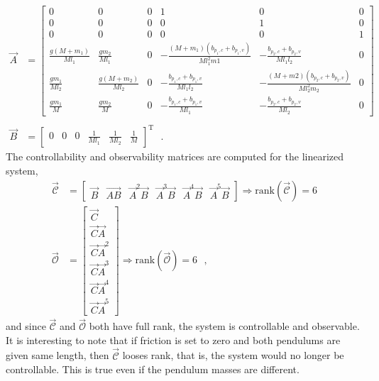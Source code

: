 \begin{align}
  \vec{A} &= 
  \begin{bmatrix}
    0                         & 0                         & 0 & 1                                                    & 0                                                    & 0 \\
    0                         & 0                         & 0 & 0                                                    & 1                                                    & 0 \\
    0                         & 0                         & 0 & 0                                                    & 0                                                    & 1 \\
    \frac{g (M + m_1)}{M l_1} & \frac{g m_2}{M l_1}       & 0 & -\frac{(M + m_1)(b_{p_1,c} + b_{p_1,v})}{M l_1^2 m1} & -\frac{b_{p_2,c} + b_{p_2,v}}{M l_1 l_2}             & 0 \\
    \frac{g m_1}{M l_2}       & \frac{g (M + m_2)}{M l_2} & 0 & -\frac{b_{p_1,c} + b_{p_1,v}}{M l_1 l_2}             & -\frac{(M + m2)(b_{p_2,c} + b_{p_2,v})}{M l_2^2 m_2} & 0 \\
    \frac{g m_1}{M}           & \frac{g m_2}{M}           & 0 & -\frac{b_{p_1,c} + b_{p_1,v}}{M l_1}                 & -\frac{b_{p_2,c} + b_{p_2,v}}{M l_2}                 & 0
  \end{bmatrix}  \label{eq:linearTwin_A} \\
  \nonumber \\
  \vec{B} &= 
  \begin{bmatrix}
    0  &  0  &  0  &  \frac{1}{M l_1} & \frac{1}{M l_2} & \frac{1}{M}
  \end{bmatrix}^{\mathrm{T}}   \ \ \ .
  \label{eq:linearTwin_B}
\end{align}
%
The controllability and observability matrices are computed for the linearized system,
\begin{align}
  \vec{\mathcal{C}} &= \begin{bmatrix} \vec{B} & \vec{AB} & \vec{A}^2 \vec{B} & \vec{A}^3 \vec{B} & \vec{A}^4 \vec{B} & \vec{A}^5 \vec{B} \end{bmatrix} \Rightarrow  \mathrm{rank}(\vec{\mathcal{C}}) = 6  \label{eq:controllabilityTwin} \\
  \vec{\mathcal{O}} &= \begin{bmatrix} \vec{C} \\ \vec{C}\vec{A} \\ \vec{C}\vec{A}^2 \\ \vec{C}\vec{A}^3 \\ \vec{C}\vec{A}^4 \\ \vec{C}\vec{A}^5 \end{bmatrix} \Rightarrow  \mathrm{rank}(\vec{\mathcal{O}}) = 6  \ \ \ ,
  \label{eq:observabilityTwin}
\end{align}
and since $\vec{\mathcal{C}}$ and $\vec{\mathcal{O}}$ both have full rank, the system is controllable and observable. It is interesting to note that if friction is set to zero and both pendulums are given same length, then $\vec{\mathcal{C}}$ looses rank, that is, the system would no longer be controllable. This is true even if the pendulum masses are different.


